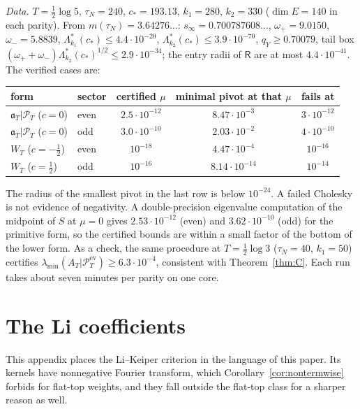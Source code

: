 \documentclass[11pt]{amsart}
\theoremstyle{definition}
\theoremstyle{remark}
\newcommand{\PT}{\mathcal P_T}
\begin{document}
\emph{Data.} $T=\frac12\log5$, $\tau_N=240$, $c_*=193.13$, $k_1=280$, $k_2=330$ ($\dim E=140$ in each parity).
From $m(\tau_N)=3.64276\ldots$: $s_\infty=0.700787608\ldots$, $\omega_+=9.0150$, $\omega_-=5.8839$,
$\Lambda^*_{k_1}(c_*)\le4.4\cdot10^{-20}$, $\Lambda^*_{k_2}(c_*)\le3.9\cdot10^{-70}$, $q_Y\ge0.70079$, tail
box $(\omega_++\omega_-)\Lambda^*_{k_2}(c_*)^{1/2}\le2.9\cdot10^{-34}$; the entry radii of $\mathsf R$ are at
most $4.4\cdot10^{-41}$. The verified cases are:
\begin{center}\small
\begin{tabular}{@{}llccc@{}}
\toprule
form & sector & certified $\mu$ & minimal pivot at that $\mu$ & fails at\\
\midrule
$\mathfrak a_T|\PT$ ($c=0$) & even & $2.5\cdot10^{-12}$ & $8.47\cdot10^{-3}$ & $3\cdot10^{-12}$\\
$\mathfrak a_T|\PT$ ($c=0$) & odd & $3.0\cdot10^{-10}$ & $2.03\cdot10^{-2}$ & $4\cdot10^{-10}$\\
$W_T$ ($c=-\frac12$) & even & $10^{-18}$ & $4.47\cdot10^{-4}$ & $10^{-16}$\\
$W_T$ ($c=\frac12$) & odd & $10^{-16}$ & $8.14\cdot10^{-14}$ & $10^{-14}$\\
\bottomrule
\end{tabular}
\end{center}
The radius of the smallest pivot in the last row is below $10^{-24}$. A failed Cholesky is not evidence of
negativity. A double-precision eigenvalue computation of the midpoint of $S$ at $\mu=0$ gives
$2.53\cdot10^{-12}$ (even) and $3.62\cdot10^{-10}$ (odd) for the primitive form, so the certified bounds are
within a small factor of the bottom of the lower form. As a check, the same procedure at
$T=\frac12\log3$ ($\tau_N=40$, $k_1=50$) certifies $\lambda_{\min}(A_T|\PT^{\mathrm{ev}})\ge6.3\cdot10^{-4}$,
consistent with Theorem~\ref{thm:C}. Each run takes about seven minutes per parity on one core.


\section{The Li coefficients}\label{app:li}

This appendix places the Li--Keiper criterion in the language of this paper. Its kernels have
nonnegative Fourier transform, which Corollary~\ref{cor:nontermwise} forbids for flat-top weights, and
they fall outside the flat-top class for a sharper reason as well.
\end{document}
